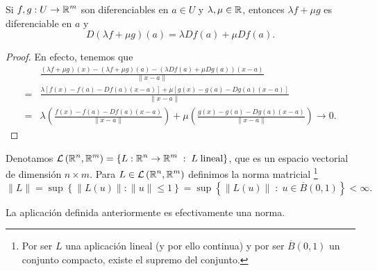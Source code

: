 \begin{prop}
Si $\displaystyle f,g : U \to \mathbb{R}^{m} $ son diferenciables en $\displaystyle a \in U $ y $\displaystyle \lambda, \mu \in \mathbb{R} $, entonces $\displaystyle \lambda f + \mu g $ es diferenciable en $\displaystyle a $ y  
\[ D\left(\lambda f + \mu g\right)\left(a\right) = \lambda Df\left(a\right) + \mu Df\left(a\right).\]
\end{prop}
\begin{proof}
En efecto, tenemos que
\[
\begin{split}
 & \frac{\left(\lambda f + \mu g\right)\left(x\right) - \left(\lambda f + \mu g\right)\left(a\right) - \left(\lambda Df\left(a\right)+\mu Dg\left(a\right)\right)\left(x-a\right)}{\|x-a\|} \\
	= & \frac{\lambda \left[f\left(x\right)-f\left(a\right) - Df\left(a\right)\left(x-a\right)\right] +\mu \left[g\left(x\right)-g\left(a\right)-Dg\left(a\right)\left(x-a\right)\right] }{\|x-a\|} \\
	= & \lambda \left(\frac{f\left(x\right)-f\left(a\right)-Df\left(a\right)\left(x-a\right)}{\|x-a\|}\right) + \mu \left(\frac{g\left(x\right)-g\left(a\right)-Dg\left(a\right)\left(x-a\right)}{\|x-a\|}\right) \to 0.
\end{split}
\]
\end{proof}
\begin{notation}
	Denotamos $\displaystyle \mathcal{L}\left(\mathbb{R}^{n}, \mathbb{R}^{m}\right) = \left\{ L : \mathbb{R}^{n} \to \mathbb{R}^{m}\; : \; L \; \text{lineal}\right\}  $, que es un espacio vectorial de dimensión $\displaystyle n \times m $. Para $\displaystyle L \in \mathcal{L}\left(\mathbb{R}^{n}, \mathbb{R}^{m}\right) $ definimos la norma matricial \footnote{Por ser $\displaystyle L $ una aplicación lineal (y por ello continua) y por ser $\displaystyle \overline{B}\left(0,1\right) $ un conjunto compacto, existe el supremo del conjunto.} 
	\[ \|L\| = \sup \left\{ \|L\left(u\right)\| : \|u\|\leq 1\right\} = \sup \left\{ \|L\left(u\right)\| \; : \; u \in \overline{B}\left(0,1\right)\right\} < \infty .\]
\end{notation}
\begin{prop}
La aplicación definida anteriormente es efectivamente una norma.
\end{prop}
